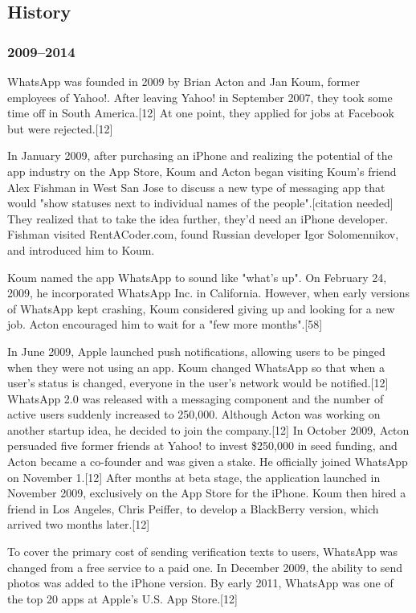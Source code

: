 \documentclass[12pt]{article}
\begin{document}
\subsection{History}


\subsubsection{2009–2014}

WhatsApp was founded in 2009 by Brian Acton and Jan Koum, former employees of Yahoo!. After leaving Yahoo! in September 2007, they took some time off in South America.[12] At one point, they applied for jobs at Facebook but were rejected.[12]

In January 2009, after purchasing an iPhone and realizing the potential of the app industry on the App Store, Koum and Acton began visiting Koum's friend Alex Fishman in West San Jose to discuss a new type of messaging app that would "show statuses next to individual names of the people".[citation needed] They realized that to take the idea further, they'd need an iPhone developer. Fishman visited RentACoder.com, found Russian developer Igor Solomennikov, and introduced him to Koum.

Koum named the app WhatsApp to sound like "what's up". On February 24, 2009, he incorporated WhatsApp Inc. in California. However, when early versions of WhatsApp kept crashing, Koum considered giving up and looking for a new job. Acton encouraged him to wait for a "few more months".[58]

In June 2009, Apple launched push notifications, allowing users to be pinged when they were not using an app. Koum changed WhatsApp so that when a user's status is changed, everyone in the user's network would be notified.[12] WhatsApp 2.0 was released with a messaging component and the number of active users suddenly increased to 250,000. Although Acton was working on another startup idea, he decided to join the company.[12] In October 2009, Acton persuaded five former friends at Yahoo! to invest \$250,000 in seed funding, and Acton became a co-founder and was given a stake. He officially joined WhatsApp on November 1.[12] After months at beta stage, the application launched in November 2009, exclusively on the App Store for the iPhone. Koum then hired a friend in Los Angeles, Chris Peiffer, to develop a BlackBerry version, which arrived two months later.[12]

To cover the primary cost of sending verification texts to users, WhatsApp was changed from a free service to a paid one. In December 2009, the ability to send photos was added to the iPhone version. By early 2011, WhatsApp was one of the top 20 apps at Apple's U.S. App Store.[12]
\end{document}
